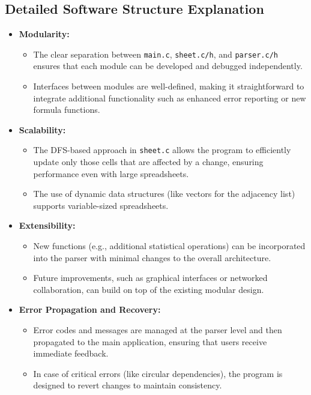 \documentclass[11pt,a4paper]{article}
\begin{document}
\subsection{Detailed Software Structure Explanation}
\begin{itemize}[noitemsep]
    \item \textbf{Modularity:}  
    \begin{itemize}[noitemsep]
        \item The clear separation between \texttt{main.c}, \texttt{sheet.c/h}, and \texttt{parser.c/h} ensures that each module can be developed and debugged independently.
        \item Interfaces between modules are well-defined, making it straightforward to integrate additional functionality such as enhanced error reporting or new formula functions.
    \end{itemize}
    \item \textbf{Scalability:}  
    \begin{itemize}[noitemsep]
        \item The DFS-based approach in \texttt{sheet.c} allows the program to efficiently update only those cells that are affected by a change, ensuring performance even with large spreadsheets.
        \item The use of dynamic data structures (like vectors for the adjacency list) supports variable-sized spreadsheets.
    \end{itemize}
    \item \textbf{Extensibility:}  
    \begin{itemize}[noitemsep]
        \item New functions (e.g., additional statistical operations) can be incorporated into the parser with minimal changes to the overall architecture.
        \item Future improvements, such as graphical interfaces or networked collaboration, can build on top of the existing modular design.
    \end{itemize}
    \item \textbf{Error Propagation and Recovery:}  
    \begin{itemize}[noitemsep]
        \item Error codes and messages are managed at the parser level and then propagated to the main application, ensuring that users receive immediate feedback.
        \item In case of critical errors (like circular dependencies), the program is designed to revert changes to maintain consistency.
    \end{itemize}
\end{itemize}
\end{document}
